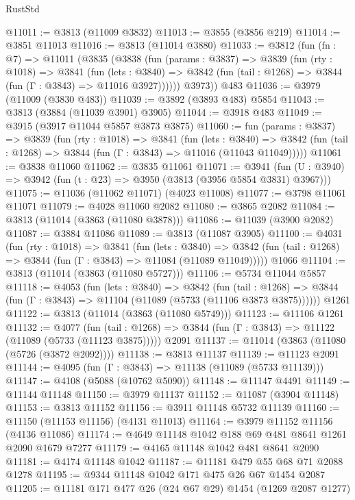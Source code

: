 \begin{lexlean}{RustStd}
\begin{coremodule}
@11011 := @3813 (@11009 @3832)
@11013 := @3855 (@3856 @219)
@11014 := @3851 @11013
@11016 := @3813 (@11014 @3880)
@11033 := @3812
    (fun (fn : @7) =>
    @11011
      (@3835
        (@3838
          (fun (params : @3837) =>
          @3839
            (fun (rty : @1018) =>
            @3841
              (fun (lets : @3840) =>
              @3842 (fun (tail : @1268) => @3844 (fun (Γ : @3843) => @11016 @3927))))))
        @3973))
    @483
@11036 := @3979 (@11009 (@3830 @483))
@11039 := @3892 (@3893 @483) @5854
@11043 := @3813 (@3884 (@11039 @3901) @3905)
@11044 := @3918 @483
@11049 := @3915 (@3917 @11044 @5857 @3873 @3875)
@11060 := fun (params : @3837) =>
  @3839
    (fun (rty : @1018) =>
    @3841
      (fun (lets : @3840) =>
      @3842 (fun (tail : @1268) => @3844 (fun (Γ : @3843) => @11016 (@11043 @11049)))))
@11061 := @3838 @11060
@11062 := @3835 @11061
@11071 := @3941
    (fun (U : @3940) => @3942 (fun (t : @23) => @3950 (@3813 (@3956 @5854 @3831) @3967)))
@11075 := @11036 (@11062 @11071) (@4023 @11008)
@11077 := @3798 @11061 @11071
@11079 := @4028 @11060 @2082
@11080 := @3865 @2082
@11084 := @3813 (@11014 (@3863 (@11080 @3878)))
@11086 := @11039 (@3900 @2082)
@11087 := @3884 @11086
@11089 := @3813 (@11087 @3905)
@11100 := @4031
    (fun (rty : @1018) =>
    @3841
      (fun (lets : @3840) =>
      @3842 (fun (tail : @1268) => @3844 (fun (Γ : @3843) => @11084 (@11089 @11049)))))
    @1066
@11104 := @3813 (@11014 (@3863 (@11080 @5727)))
@11106 := @5734 @11044 @5857
@11118 := @4053
    (fun (lets : @3840) =>
    @3842
      (fun (tail : @1268) =>
      @3844 (fun (Γ : @3843) => @11104 (@11089 (@5733 (@11106 @3873 @3875))))))
    @1261
@11122 := @3813 (@11014 (@3863 (@11080 @5749)))
@11123 := @11106 @1261
@11132 := @4077
    (fun (tail : @1268) => @3844 (fun (Γ : @3843) => @11122 (@11089 (@5733 (@11123 @3875)))))
    @2091
@11137 := @11014 (@3863 (@11080 (@5726 (@3872 @2092))))
@11138 := @3813 @11137
@11139 := @11123 @2091
@11144 := @4095 (fun (Γ : @3843) => @11138 (@11089 (@5733 @11139)))
@11147 := @4108 (@5088 (@10762 @5090))
@11148 := @11147 @4491
@11149 := @11144 @11148
@11150 := @3979 @11137
@11152 := @11087 (@3904 @11148)
@11153 := @3813 @11152
@11156 := @3911 @11148 @5732 @11139
@11160 := @11150 (@11153 @11156) (@4131 @11013)
@11164 := @3979 @11152 @11156 (@4136 @11086)
@11174 := @4649 @11148 @1042 @188 @69 @481 @8641 @1261 @2090 @1679 @7277
@11179 := @4165 @11148 @1042 @481 @8641 @2090
@11181 := @4174 @11148 @1042
@11187 := @11181 @479 @55 @68 @71 @2088 @1278
@11195 := @9344 @11148 @1042 @171 @475 @26 @67 @1454 @2087
@11205 := @11181 @171 @477 @26 (@24 @67 @29) @1454 (@1269 @2087 @1277)

\end{coremodule}
\end{lexlean}
